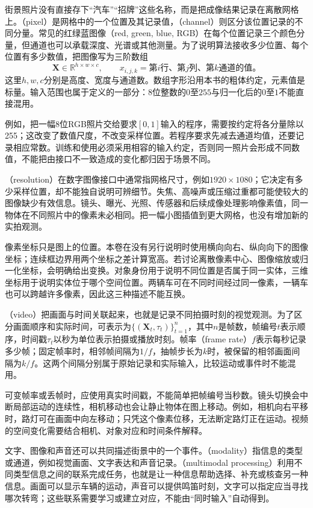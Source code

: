 街景照片没有直接存下“汽车”“招牌”这些名称，而是把成像结果记录在离散网格上。（pixel）是网格中的一个位置及其记录值，（channel）则区分该位置记录的不同分量。常见的红绿蓝图像（red, green, blue, RGB）在每个位置记录三个颜色分量，但通道也可以承载深度、光谱或其他测量。为了说明算法接收多少位置、每个位置有多少数值，把图像写为三阶数组
\begin{equation}
  \bm{X}\in\mathbb{R}^{h\times w\times c},
  \qquad x_{i,j,k}=\text{第$i$行、第$j$列、第$k$通道的值。}
  \label{eq:vision-image-array}
\end{equation}
这里$h,w,c$分别是高度、宽度与通道数。数组字形沿用本书的粗体约定，元素值是标量。输入范围也属于定义的一部分：8位整数的$0$至$255$与归一化后的$0$至$1$不能直接混用。

例如，把一幅8位RGB照片交给要求$[0,1]$输入的程序，需要按约定将各分量除以255；这改变了数值尺度，不改变采样位置。若程序要求先减去通道均值，还要记录相应常数。训练和使用必须采用相容的输入约定，否则同一照片会形成不同数值，不能把由接口不一致造成的变化都归因于场景不同。

（resolution）在数字图像接口中通常指网格尺寸，例如$1920\times1080$；它决定有多少采样位置，却不能独自说明可辨细节。失焦、高噪声或压缩过重都可能使较大的图像缺少有效信息。镜头、曝光、光照、传感器和后续成像处理影响像素值，同一物体在不同照片中的像素未必相同。把一幅小图插值到更大网格，也没有增加新的实拍观测。

像素坐标只是图上的位置。本卷在没有另行说明时使用横向向右、纵向向下的图像坐标；连续框边界用两个坐标之差计算宽高。若讨论离散像素中心、图像缩放或归一化坐标，会明确给出变换。对象身份用于说明不同位置是否属于同一实体，三维坐标用于说明实体位于哪个空间位置。两辆车可在不同时间经过同一像素，一辆车也可以跨越许多像素，因此这三种描述不能互换。

（video）把画面与时间关联起来，也就是记录不同拍摄时刻的视觉观测。为了区分画面顺序和实际时间，可表示为$\{(\bm{X}_t,\tau_t)\}_{t=1}^{n}$，其中$n$是帧数，帧编号$t$表示顺序，时间戳$\tau_t$以秒为单位表示拍摄或播放时刻。帧率（frame rate）$f$表示每秒记录多少帧；固定帧率时，相邻帧间隔为$1/f$，抽帧步长为$k$时，被保留的相邻画面间隔为$k/f$。这两个间隔分别属于原始记录和实际输入，比较运动或事件时不能混用。

可变帧率或丢帧时，应使用真实时间戳，不能简单把帧编号当秒数。镜头切换会中断局部运动的连续性，相机移动也会让静止物体在图上移动。例如，相机向右平移时，路灯可在画面中向左移动；只凭这个像素位移，无法断定路灯正在运动。视频的空间变化需要结合相机、对象对应和时间条件解释。

文字、图像和声音还可以共同描述街景中的一个事件。（modality）指信息的类型或通道，例如视觉画面、文字表达和声音记录。（multimodal processing）利用不同类型信息之间的联系完成任务，也就是让一种信息帮助选择、补充或核查另一种信息。画面可以显示车辆的运动，声音可以提供鸣笛时刻，文字可以指定应当寻找哪次转弯；这些联系需要学习或建立对应，不能由“同时输入”自动得到。

